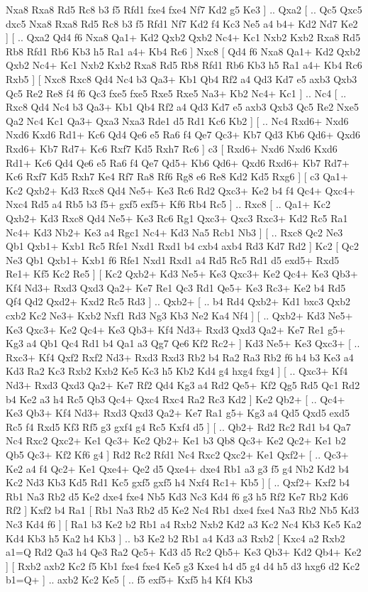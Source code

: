  Nxa8 Rxa8  Rd5 Rc8  b3 f5  Rfd1 fxe4  fxe4 Nf7  Kd2 g5  Ke3   ] .. Qxa2 [ .. Qc5  Qxc5 dxc5  Nxa8 Rxa8  Rd5 Rc8  b3 f5  Rfd1 Nf7  Kd2 f4  Kc3 Ne5  a4 b4+  Kd2 Nd7  Ke2   ]  [ .. Qxa2  Qd4 f6  Nxa8 Qa1+  Kd2 Qxb2  Qxb2 Nc4+  Kc1 Nxb2  Kxb2 Rxa8  Rd5 Rb8  Rfd1 Rb6  Kb3 h5  Ra1 a4+  Kb4 Rc6   ]  Nxc8 [  Qd4 f6  Nxa8 Qa1+  Kd2 Qxb2  Qxb2 Nc4+  Kc1 Nxb2  Kxb2 Rxa8  Rd5 Rb8  Rfd1 Rb6  Kb3 h5  Ra1 a4+  Kb4 Rc6  Rxb5   ]  [  Nxc8 Rxc8  Qd4 Nc4  b3 Qa3+  Kb1 Qb4  Rf2 a4  Qd3 Kd7  e5 axb3  Qxb3 Qc5  Re2 Re8  f4 f6  Qc3 fxe5  fxe5 Rxe5  Rxe5 Na3+  Kb2 Nc4+  Kc1   ] .. Nc4 [ .. Rxc8  Qd4 Nc4  b3 Qa3+  Kb1 Qb4  Rf2 a4  Qd3 Kd7  e5 axb3  Qxb3 Qc5  Re2 Nxe5  Qa2 Nc4  Kc1 Qa3+  Qxa3 Nxa3  Rde1 d5  Rd1 Kc6  Kb2   ]  [ .. Nc4  Rxd6+ Nxd6  Nxd6 Kxd6  Rd1+ Kc6  Qd4 Qe6  e5 Ra6  f4 Qe7  Qc3+ Kb7  Qd3 Kb6  Qd6+ Qxd6  Rxd6+ Kb7  Rd7+ Kc6  Rxf7 Kd5  Rxh7 Rc6   ]  c3 [  Rxd6+ Nxd6  Nxd6 Kxd6  Rd1+ Kc6  Qd4 Qe6  e5 Ra6  f4 Qe7  Qd5+ Kb6  Qd6+ Qxd6  Rxd6+ Kb7  Rd7+ Kc6  Rxf7 Kd5  Rxh7 Ke4  Rf7 Ra8  Rf6 Rg8  e6 Re8  Kd2 Kd5  Rxg6   ]  [  c3 Qa1+  Kc2 Qxb2+  Kd3 Rxc8  Qd4 Ne5+  Ke3 Rc6  Rd2 Qxc3+  Ke2 b4  f4 Qc4+  Qxc4+ Nxc4  Rd5 a4  Rb5 b3  f5+ gxf5  exf5+ Kf6  Rb4 Rc5   ] .. Rxc8 [ .. Qa1+  Kc2 Qxb2+  Kd3 Rxc8  Qd4 Ne5+  Ke3 Rc6  Rg1 Qxc3+  Qxc3 Rxc3+  Kd2 Rc5  Ra1 Nc4+  Kd3 Nb2+  Ke3 a4  Rgc1 Nc4+  Kd3 Na5  Rcb1 Nb3   ]  [ .. Rxc8  Qc2 Ne3  Qb1 Qxb1+  Kxb1 Rc5  Rfe1 Nxd1  Rxd1 b4  cxb4 axb4  Rd3 Kd7  Rd2   ]  Kc2 [  Qc2 Ne3  Qb1 Qxb1+  Kxb1 f6  Rfe1 Nxd1  Rxd1 a4  Rd5 Rc5  Rd1 d5  exd5+ Rxd5  Re1+ Kf5  Kc2 Re5   ]  [  Kc2 Qxb2+  Kd3 Ne5+  Ke3 Qxc3+  Ke2 Qc4+  Ke3 Qb3+  Kf4 Nd3+  Rxd3 Qxd3  Qa2+ Ke7  Re1 Qc3  Rd1 Qe5+  Ke3 Rc3+  Ke2 b4  Rd5 Qf4  Qd2 Qxd2+  Kxd2 Rc5  Rd3   ] .. Qxb2+ [ .. b4  Rd4 Qxb2+  Kd1 bxc3  Qxb2 cxb2  Kc2 Ne3+  Kxb2 Nxf1  Rd3 Ng3  Kb3 Ne2  Ka4 Nf4   ]  [ .. Qxb2+  Kd3 Ne5+  Ke3 Qxc3+  Ke2 Qc4+  Ke3 Qb3+  Kf4 Nd3+  Rxd3 Qxd3  Qa2+ Ke7  Re1 g5+  Kg3 a4  Qb1 Qc4  Rd1 b4  Qa1 a3  Qg7 Qe6  Kf2 Rc2+   ]  Kd3  Ne5+    Ke3   Qxc3+ [ .. Rxc3+  Kf4 Qxf2  Rxf2 Nd3+  Rxd3 Rxd3  Rb2 b4  Ra2 Ra3  Rb2 f6  h4 b3  Ke3 a4  Kd3 Ra2  Kc3 Rxb2  Kxb2 Ke5  Kc3 h5  Kb2 Kd4  g4 hxg4  fxg4   ]  [ .. Qxc3+  Kf4 Nd3+  Rxd3 Qxd3  Qa2+ Ke7  Rf2 Qd4  Kg3 a4  Rd2 Qe5+  Kf2 Qg5  Rd5 Qc1  Rd2 b4  Ke2 a3  h4 Rc5  Qb3 Qc4+  Qxc4 Rxc4  Ra2 Rc3  Kd2   ]  Ke2   Qb2+ [ .. Qc4+  Ke3 Qb3+  Kf4 Nd3+  Rxd3 Qxd3  Qa2+ Ke7  Ra1 g5+  Kg3 a4  Qd5 Qxd5  exd5 Rc5  f4 Rxd5  Kf3 Rf5  g3 gxf4  g4 Rc5  Kxf4 d5   ]  [ .. Qb2+  Rd2 Rc2  Rd1 b4  Qa7 Nc4  Rxc2 Qxc2+  Ke1 Qc3+  Ke2 Qb2+  Ke1 b3  Qb8 Qc3+  Ke2 Qc2+  Ke1 b2  Qb5 Qc3+  Kf2 Kf6  g4   ]  Rd2   Rc2    Rfd1   Nc4    Rxc2   Qxc2+    Ke1   Qxf2+ [ .. Qc3+  Ke2 a4  f4 Qc2+  Ke1 Qxe4+  Qe2 d5  Qxe4+ dxe4  Rb1 a3  g3 f5  g4 Nb2  Kd2 b4  Kc2 Nd3  Kb3 Kd5  Rd1 Kc5  gxf5 gxf5  h4 Nxf4  Rc1+ Kb5   ]  [ .. Qxf2+  Kxf2 b4  Rb1 Na3  Rb2 d5  Ke2 dxe4  fxe4 Nb5  Kd3 Nc3  Kd4 f6  g3 h5  Rf2 Ke7  Rb2 Kd6  Rf2   ]  Kxf2  b4    Ra1 [  Rb1 Na3  Rb2 d5  Ke2 Nc4  Rb1 dxe4  fxe4 Na3  Rb2 Nb5  Kd3 Nc3  Kd4 f6   ]  [  Ra1 b3  Ke2 b2  Rb1 a4  Rxb2 Nxb2  Kd2 a3  Kc2 Nc4  Kb3 Ke5  Ka2 Kd4  Kb3 h5  Ka2 h4  Kb3   ] .. b3    Ke2   b2    Rb1   a4    Kd3   a3    Rxb2 [  Kxc4 a2  Rxb2 a1=Q  Rd2 Qa3  h4 Qe3  Ra2 Qc5+  Kd3 d5  Rc2 Qb5+  Ke3 Qb3+  Kd2 Qb4+  Ke2   ]  [  Rxb2 axb2  Kc2 f5  Kb1 fxe4  fxe4 Ke5  g3 Kxe4  h4 d5  g4 d4  h5 d3  hxg6 d2  Kc2 b1=Q+   ] .. axb2    Kc2   Ke5 [ .. f5  exf5+ Kxf5  h4 Kf4  Kb3 